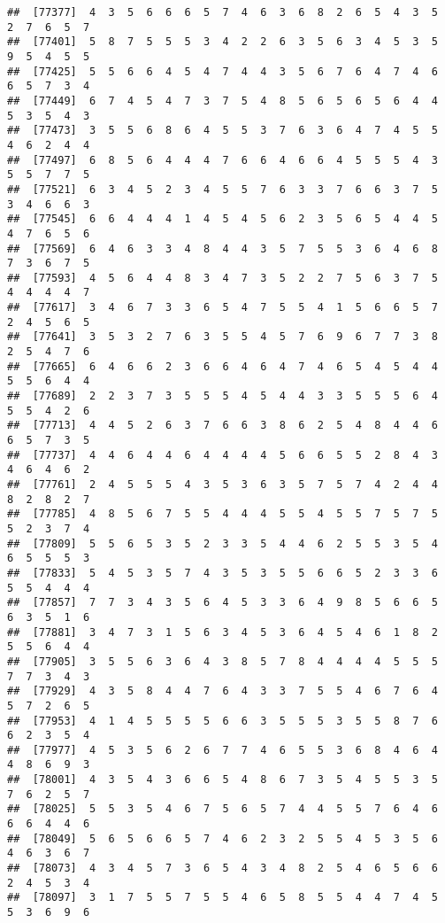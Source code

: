 \documentclass[
]{book}
\begin{document}
\begin{verbatim}
##  [77377]  4  3  5  6  6  6  5  7  4  6  3  6  8  2  6  5  4  3  5  2  7  6  5  7
##  [77401]  5  8  7  5  5  5  3  4  2  2  6  3  5  6  3  4  5  3  5  9  5  4  5  5
##  [77425]  5  5  6  6  4  5  4  7  4  4  3  5  6  7  6  4  7  4  6  6  5  7  3  4
##  [77449]  6  7  4  5  4  7  3  7  5  4  8  5  6  5  6  5  6  4  4  5  3  5  4  3
##  [77473]  3  5  5  6  8  6  4  5  5  3  7  6  3  6  4  7  4  5  5  4  6  2  4  4
##  [77497]  6  8  5  6  4  4  4  7  6  6  4  6  6  4  5  5  5  4  3  5  5  7  7  5
##  [77521]  6  3  4  5  2  3  4  5  5  7  6  3  3  7  6  6  3  7  5  3  4  6  6  3
##  [77545]  6  6  4  4  4  1  4  5  4  5  6  2  3  5  6  5  4  4  5  4  7  6  5  6
##  [77569]  6  4  6  3  3  4  8  4  4  3  5  7  5  5  3  6  4  6  8  7  3  6  7  5
##  [77593]  4  5  6  4  4  8  3  4  7  3  5  2  2  7  5  6  3  7  5  4  4  4  4  7
##  [77617]  3  4  6  7  3  3  6  5  4  7  5  5  4  1  5  6  6  5  7  2  4  5  6  5
##  [77641]  3  5  3  2  7  6  3  5  5  4  5  7  6  9  6  7  7  3  8  2  5  4  7  6
##  [77665]  6  4  6  6  2  3  6  6  4  6  4  7  4  6  5  4  5  4  4  5  5  6  4  4
##  [77689]  2  2  3  7  3  5  5  5  4  5  4  4  3  3  5  5  5  6  4  5  5  4  2  6
##  [77713]  4  4  5  2  6  3  7  6  6  3  8  6  2  5  4  8  4  4  6  6  5  7  3  5
##  [77737]  4  4  6  4  4  6  4  4  4  4  5  6  6  5  5  2  8  4  3  4  6  4  6  2
##  [77761]  2  4  5  5  5  4  3  5  3  6  3  5  7  5  7  4  2  4  4  8  2  8  2  7
##  [77785]  4  8  5  6  7  5  5  4  4  4  5  5  4  5  5  7  5  7  5  5  2  3  7  4
##  [77809]  5  5  6  5  3  5  2  3  3  5  4  4  6  2  5  5  3  5  4  6  5  5  5  3
##  [77833]  5  4  5  3  5  7  4  3  5  3  5  5  6  6  5  2  3  3  6  5  5  4  4  4
##  [77857]  7  7  3  4  3  5  6  4  5  3  3  6  4  9  8  5  6  6  5  6  3  5  1  6
##  [77881]  3  4  7  3  1  5  6  3  4  5  3  6  4  5  4  6  1  8  2  5  5  6  4  4
##  [77905]  3  5  5  6  3  6  4  3  8  5  7  8  4  4  4  4  5  5  5  7  7  3  4  3
##  [77929]  4  3  5  8  4  4  7  6  4  3  3  7  5  5  4  6  7  6  4  5  7  2  6  5
##  [77953]  4  1  4  5  5  5  5  6  6  3  5  5  5  3  5  5  8  7  6  6  2  3  5  4
##  [77977]  4  5  3  5  6  2  6  7  7  4  6  5  5  3  6  8  4  6  4  4  8  6  9  3
##  [78001]  4  3  5  4  3  6  6  5  4  8  6  7  3  5  4  5  5  3  5  7  6  2  5  7
##  [78025]  5  5  3  5  4  6  7  5  6  5  7  4  4  5  5  7  6  4  6  6  6  4  4  6
##  [78049]  5  6  5  6  6  5  7  4  6  2  3  2  5  5  4  5  3  5  6  4  6  3  6  7
##  [78073]  4  3  4  5  7  3  6  5  4  3  4  8  2  5  4  6  5  6  6  2  4  5  3  4
##  [78097]  3  1  7  5  5  7  5  5  4  6  5  8  5  5  4  4  7  4  5  5  3  6  9  6

\end{verbatim}
\end{document}
